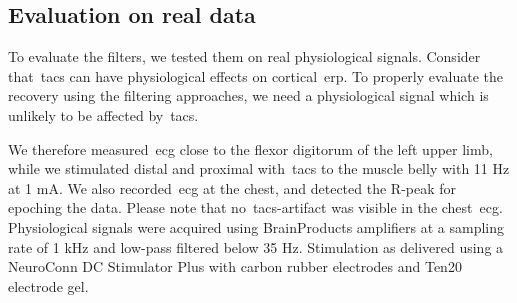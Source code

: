 \documentclass[a4paper]{article}
\begin{document}
\subsection{Evaluation on real data}\label{sec:EvaluationData}

To evaluate the filters, we tested them on real physiological signals. Consider that~\gls{tacs} can have physiological effects on cortical~\gls{erp}. To properly evaluate the recovery using the filtering approaches, we need a physiological signal which is unlikely to be affected by~\gls{tacs}.

We therefore measured~\gls{ecg} close to the flexor digitorum of the left upper limb, while we stimulated distal and proximal with~\gls{tacs} to the muscle belly with 11 Hz at 1 mA. We also recorded~\gls{ecg} at the chest, and detected the R-peak for epoching the data. Please note that no~\gls{tacs}-artifact was visible in the chest~\gls{ecg}.
Physiological signals were acquired using BrainProducts amplifiers at a sampling rate of 1 kHz and low-pass filtered below 35 Hz. Stimulation as delivered using a NeuroConn DC Stimulator Plus with carbon rubber electrodes and Ten20 electrode gel.
\end{document}
